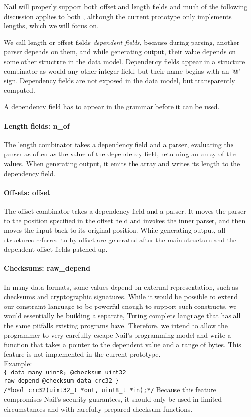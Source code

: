 Nail will properly support both offset and length fields and much of the
following discussion applies to both , although the current prototype only
implements lengths, which we will focus on.

We call length or offset fields \textit{dependent fields}, because during
parsing, another parser depends on them, and while generating output, their
value depends on some other structure in the data model. Dependency fields
appear in a structure combinator as would any other integer field, but their
name begins with an '@' sign. Dependency fields are not exposed in the data
model, but transparently computed.

A dependency field has to appear in the grammar before it can be used. 
\paragraph{Length fields: n_of}
The length combinator takes a dependency field and a parser, evaluating the
parser as often as the value of the dependency field, returning an array of the
values. When generating output, it emits the array and writes its length to the
dependency field.
\paragraph{Offsets: offset} 
The offset combinator takes a dependency field and a parser. It moves the parser
to the position specified in the offset field and invokes the inner parser, and
then moves the input back to its original position.
While generating output, all structures referred to by offset are generated
after the main structure and the dependent offset fields patched up.

\paragraph{Checksums: raw_depend}
In many data formats, some values depend on external representation, such as
checksums and cryptographic signatures. While it would be possible to extend
our constraint language to be powerful enough to support such constructs, we
would essentially be building a separate, Turing complete language that has all
the same pitfalls existing programs have. Therefore, we intend to  allow the programmer to
very carefully escape Nail's programming model and write a function that takes a
pointer to the dependent value and a range of bytes. 
This feature is not implemented in the current prototype. \\
Example:\\
 \verb+{ data many uint8; @checksum uint32+\\
 \verb+raw_depend @checksum data crc32 }+\\
 \verb+/*bool crc32(uint32_t *out, uint8_t *in);*/+
Because this feature compromises Nail's security guarantees, it should only be
used in limited circumstances and with carefully prepared checksum functions. 
